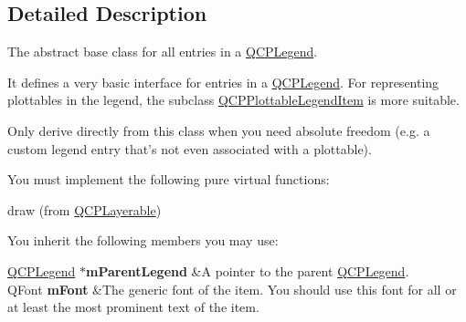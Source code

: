 \subsection{\-Detailed \-Description}
\-The abstract base class for all entries in a \hyperlink{classQCPLegend}{\-Q\-C\-P\-Legend}. 

\-It defines a very basic interface for entries in a \hyperlink{classQCPLegend}{\-Q\-C\-P\-Legend}. \-For representing plottables in the legend, the subclass \hyperlink{classQCPPlottableLegendItem}{\-Q\-C\-P\-Plottable\-Legend\-Item} is more suitable.

\-Only derive directly from this class when you need absolute freedom (e.\-g. a custom legend entry that's not even associated with a plottable).

\-You must implement the following pure virtual functions\-: \begin{DoxyItemize}
\item draw (from \hyperlink{classQCPLayerable}{\-Q\-C\-P\-Layerable})\end{DoxyItemize}
\-You inherit the following members you may use\-: \begin{TabularC}{2}
\hline
\hyperlink{classQCPLegend}{\-Q\-C\-P\-Legend} $\ast${\bfseries m\-Parent\-Legend}  &\-A pointer to the parent \hyperlink{classQCPLegend}{\-Q\-C\-P\-Legend}. \\
\-Q\-Font {\bfseries m\-Font}  &\-The generic font of the item. \-You should use this font for all or at least the most prominent text of the item.  \\
\end{TabularC}



